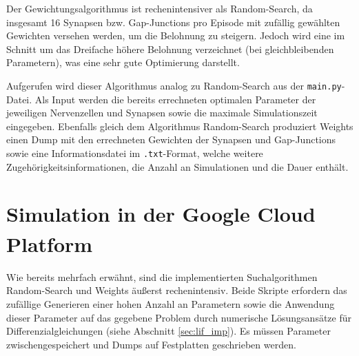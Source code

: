 		Der Gewichtungsalgorithmus ist rechenintensiver als Random-Search, da insgesamt 16 Synapsen bzw. Gap-Junctions pro Episode mit zufällig gewählten Gewichten versehen werden, um die Belohnung zu steigern. Jedoch wird eine im Schnitt um das Dreifache höhere Belohnung verzeichnet (bei gleichbleibenden Parametern), was eine sehr gute Optimierung darstellt.
		
		Aufgerufen wird dieser Algorithmus analog zu Random-Search aus der \texttt{main.py}-Datei. Als Input werden die bereits errechneten optimalen Parameter der jeweiligen Nervenzellen und Synapsen sowie die maximale Simulationszeit eingegeben. Ebenfalls gleich dem Algorithmus Random-Search produziert Weights einen Dump mit den errechneten Gewichten der Synapsen und Gap-Junctions sowie eine Informationsdatei im \texttt{.txt}-Format, welche weitere Zugehörigkeitsinformationen, die Anzahl an Simulationen und die Dauer enthält.
		
	\section{Simulation in der Google Cloud Platform\textsuperscript{\textregistered}}
	Wie bereits mehrfach erwähnt, sind die implementierten Suchalgorithmen Random-Search und Weights äußerst rechenintensiv. Beide Skripte erfordern das zufällige Generieren einer hohen Anzahl an Parametern sowie die Anwendung dieser Parameter auf das gegebene Problem durch numerische Lösungsansätze für Differenzialgleichungen (siehe Abschnitt \ref{sec:lif_imp}). Es müssen Parameter zwischengespeichert und Dumps auf Festplatten geschrieben werden.
	
